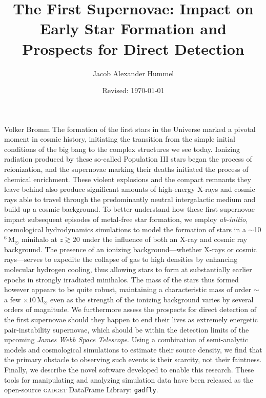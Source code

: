 \documentclass{thesis}
\newcommand{\msun}{\ensuremath{\,\mathrm{M}_{\odot}}\xspace}
\begin{document}
\author{Jacob Alexander Hummel} 
\title{The First Supernovae: Impact on Early Star Formation and Prospects for Direct Detection} 
\date{Revised: \today}

\UTcopyrightlegend %

\begin{UTcommittee}
\end{UTcommittee}


\frontmatter

\setcounter{page}{4}

%
%

\begin{UTabstract}{Volker Bromm}
The formation of the first stars in the Universe marked a pivotal moment in cosmic history, initiating the transition from the simple initial conditions of the big bang to the complex structures we see today.
Ionizing radiation produced by these so-called Population III stars began the process of reionization, and the supernovae marking their deaths initiated the process of chemical enrichment. 
These violent explosions and the compact remnants they leave behind also produce significant amounts of high-energy X-rays and cosmic rays able  to travel through the predominantly neutral intergalactic medium and build up a cosmic background.
To better understand how these first supernovae impact subsequent episodes of metal-free star formation, we employ \textit{ab-initio}, cosmological hydrodynamics simulations to model the formation of stars in a $\sim$10$^6\msun$ minihalo at $z \gtrsim 20$ under the influence of both an X-ray and cosmic ray background.
The presence of an ionizing background---whether X-rays or cosmic rays---serves to expedite the collapse of gas to high densities by enhancing molecular hydrogen cooling, thus allowing stars to form at substantially earlier epochs in strongly irradiated minihalos.
The mass of the stars thus formed however appears to be quite robust, maintaining a characteristic mass of order $\sim$ a few $\times10\msun$ even as the strength of the ionizing background varies by several orders of magnitude.
We furthermore assess the prospects for direct detection of the first supernovae should they happen to end their lives as extremely energetic pair-instability supernovae, which should be within the detection limits of the upcoming \textit{James Webb Space Telescope}.
Using a combination of semi-analytic models and cosmological simulations to estimate their source density, we find that the primary obstacle to observing such events is their scarcity, not their faintness.
Finally, we describe the novel software developed to enable this research.  These tools for manipulating and analyzing simulation data have been released as the open-source \textsc{gadget} DataFrame Library: \verb|gadfly|.
\end{UTabstract}
\end{document}
